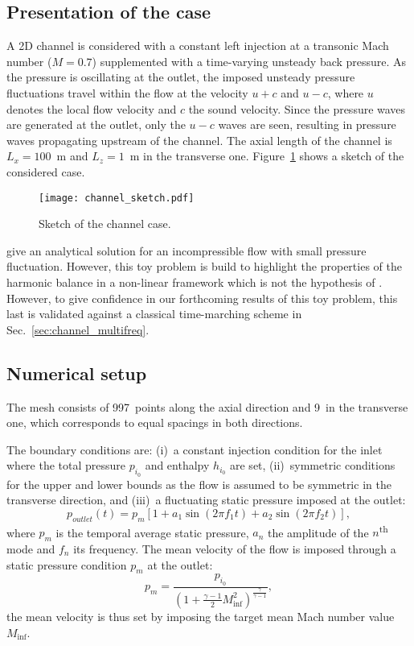 \subsection{Presentation of the case}
\label{sub:presentation_of_the_case}

A 2D channel is considered with a constant left injection at 
a transonic Mach number ($M=0.7$)
supplemented with a time-varying unsteady back pressure.
As the pressure is oscillating at the outlet, the imposed unsteady pressure
fluctuations travel within the flow at the velocity 
$u + c$ and $u - c$, where $u$ denotes 
the local flow velocity and $c$ the sound velocity.
Since the pressure waves are generated at the outlet, only
the $u-c$ waves are seen, resulting in pressure waves propagating
upstream of the channel. The axial length of the channel is $L_x = 100$~m
and $L_z = 1$~m in the transverse one.
Figure~\ref{fig:canal_principle} shows a sketch
of the considered case.
\begin{figure}[htb]
  \centering
  \texttt{[image: channel\_sketch.pdf]}
  \caption{Sketch of the channel case.}
  \label{fig:canal_principle}
\end{figure}

\citet{Merkle1987} give an analytical solution
for an incompressible flow with small pressure fluctuation.
However, this toy problem is build to highlight the properties
of the harmonic balance in a non-linear framework which is not
the hypothesis of \citet{Merkle1987}. However, to give confidence
in our forthcoming results of this toy problem,
this last is validated against a classical time-marching scheme in
Sec.~\ref{sec:channel_multifreq}.

\subsection{Numerical setup}

The mesh consists of 997~points along the axial direction and 9~in the
transverse one, which corresponds to equal spacings in both
directions. 

The boundary conditions are: (i)~a constant injection condition for the inlet
where the total pressure $p_{i_0}$ and enthalpy $h_{i_0}$ are set,
(ii)~symmetric conditions for the upper and lower bounds as the flow
is assumed to be symmetric in the transverse direction, and (iii)~a
fluctuating static pressure imposed at the outlet:
\begin{equation}
  p_{outlet}(t) = p_m \left[1 + a_1 \sin(2 \pi f_1 t) +
    a_2 \sin(2 \pi f_2 t) \right],
  \label{eq:outlet_canal}
\end{equation}
where $p_m$ is the temporal average static pressure, $a_n$ the
amplitude of the $n$\textsuperscript{th} mode and $f_n$ its
frequency.
The mean velocity of the flow is imposed through a
static pressure condition $p_m$ at the outlet:
\begin{equation}
    p_m = \frac{p_{i_0}}{\left(1 + 
    \frac{\gamma - 1}{2} M_{\inf}^2 \right) ^ {\frac{\gamma}{ \gamma - 1}}} ,
\end{equation}
the mean velocity is thus set by imposing the
target mean Mach number value $M_{\inf}$.

